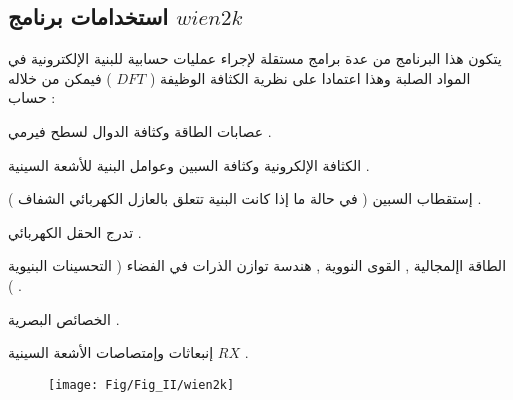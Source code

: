 \subsection{  استخدامات برنامج $ wien2k $ }

يتكون هذا البرنامج من عدة  برامج مستقلة لإجراء عمليات حسابية للبنية الإلكترونية في المواد الصلبة وهذا اعتمادا على نظرية الكثافة الوظيفة ( $ DFT $ ) فيمكن من خلاله حساب  :
\begin{list}{}{}
	\item 
	عصابات الطاقة وكثافة الدوال لسطح فيرمي .
	\item 
	الكثافة الإلكرونية وكثافة السبين وعوامل البنية للأشعة السينية .
	\item 
	إستقطاب السبين ( في حالة ما إذا كانت البنية تتعلق بالعازل الكهربائي الشفاف ) .
	\item 
	تدرج الحقل الكهربائي .
	\item 
	الطاقة اإلمجالية , القوى النووية , هندسة توازن الذرات في الفضاء ( التحسينات البنيوية ) .
	\item 
	الخصائص البصرية .
	\item 
	إنبعاثات وإمتصاصات الأشعة السينية $ RX $ .
\end{list}

\begin{figure}[h!]
	\centering
	\texttt{[image: Fig/Fig\_II/wien2k]}
	\caption{}
	\label{fig:wien2k}
\end{figure}
\FloatBarrier

